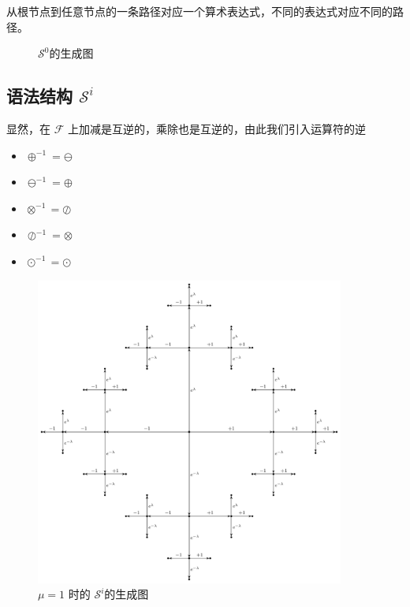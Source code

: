 \documentclass[a4paper,12pt]{article}
\numberwithin{definition}{section}
\numberwithin{lemma}{section}
\numberwithin{proposition}{section}
\numberwithin{theorem}{section}
\numberwithin{grammar}{section}
\numberwithin{program}{section}
\numberwithin{convention}{section}
\numberwithin{corollary}{section}
\begin{document}
从根节点到任意节点的一条路径对应一个算术表达式，不同的表达式对应不同的路径。

\begin{figure}[ht]
\centering
{}
\caption{$\mathcal{S}^0$的生成图}
\end{figure}

\subsection{语法结构 $\mathcal{S}^i$}\label{subsec:syntactical}

显然，在 $\mathcal{F}$ 上加减是互逆的，乘除也是互逆的，由此我们引入运算符的逆
\begin{itemize}
    \item $\oplus^{-1} = \ominus$
    \item $\ominus^{-1} = \oplus$
    \item $\otimes^{-1} = \oslash$
    \item $\oslash^{-1} = \otimes$
    \item $\odot^{-1} = \odot$
\end{itemize}

\begin{figure}[ht]
\centering
\includegraphics[width=4in]{images/cayley_i}
\caption{$\mu=1$ 时的 $\mathcal{S}^i$的生成图}
\end{figure}
\end{document}

